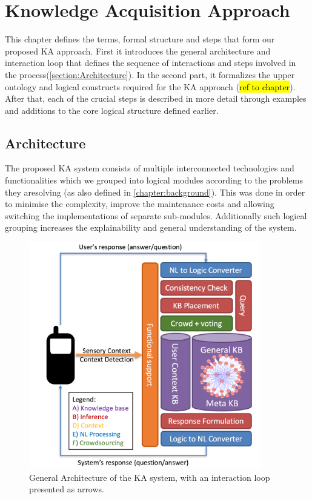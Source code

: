 % 
\chapter{Knowledge Acquisition Approach}

This chapter defines the terms, formal structure and steps that form our 
proposed KA approach. First it introduces the general architecture and 
interaction loop that defines the sequence of interactions and steps
involved in the process(\autoref{section:Architecture}). In the second part, it formalizes 
the upper ontology and logical constructs required for the KA approach 
(\hl{ref to chapter}). After that, each of the crucial steps is described in 
more detail through examples and additions to the core logical structure 
defined earlier.

\section{Architecture}
\label{section:Architecture}
The proposed KA system consists of multiple interconnected technologies and 
functionalities which we grouped into logical modules according to
the problems they aresolving (as also defined in \autoref{chapter:background}). 
This was done in order to minimise the complexity, improve the maintenance 
costs and allowing switching the implementations of separate sub-modules. 
Additionally such logical grouping increases the explainability and general
understanding of the system.

\begin{figure}[htb]
	\centering
		\includegraphics[width=0.9\textwidth]{figures/architecture.png}
	\caption{General Architecture of the KA system, with an interaction loop
			 presented as arrows.}
	\label{fig:Architecture}
\end{figure}


